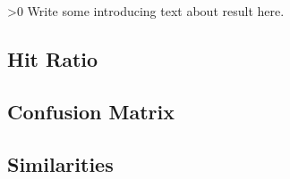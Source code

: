 \ifnum\printdraft>0
	Write some introducing text about result here.
\fi

\onecolumn
\subsection{Hit Ratio}

\onecolumn
\subsection{Confusion Matrix}

\twocolumn
\subsection{Similarities}
